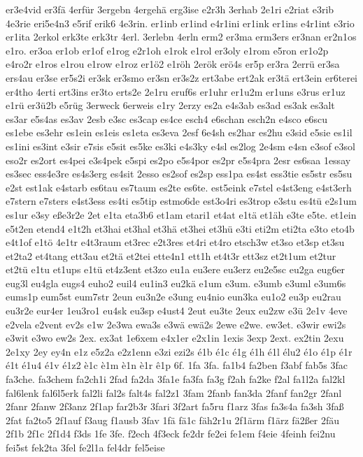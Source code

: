 {er3e4vid
er3fä
4erfür
3ergebn
4ergehä
erg3ise
e2r3h
3erhab
2e1ri
e2riat
e3rib
4e3rie
eri5e4n3
e5rif
erik6
4e3rin.
er1inb
er1ind
e4r1ini
er1ink
er1ins
e4r1int
e3rio
er1ita
2erkol
erk3te
erk3tr
4erl.
3erlebn
4erln
erm2
er3ma
erm3ers
er3nan
er2n1os
e1ro.
er3oa
er1ob
er1of
e1rog
e2r1oh
e1rok
e1rol
er3oly
e1rom
e5ron
er1o2p
e4ro2r
e1ros
e1rou
e1row
e1roz
er1ö2
e1röh
2erök
erö4s
er5p
er3ra
2errü
er3sa
ers4au
er3se
er5s2i
er3sk
er3smo
er3sn
er3s2z
ert3abe
ert2ak
er3tä
ert3ein
er6terei
er4tho
4erti
ert3ins
er3to
erts2e
2e1ru
eruf6s
er1uhr
er1u2m
er1uns
e3rus
er1uz
e1rü
er3ü2b
e5rüg
3erweck
6erweis
e1ry
2erzy
es2a
e4s3ab
es3ad
es3ak
es3alt
es3ar
e5s4as
es3av
2esb
e3sc
es3cap
es4ce
esch4
e6schan
esch2n
e4sco
e6scu
es1ebe
es3ehr
es1ein
es1eis
es1eta
es3eva
2esf
6e4sh
es2har
es2hu
e3sid
e5sie
es1il
es1ini
es3int
e3sir
e7sis
e5sit
es5ke
es3ki
e4s3ky
e4sl
es2log
2e4sm
e4sn
e3sof
e3sol
eso2r
es2ort
es4pei
e3s4pek
e5spi
es2po
e5s4por
es2pr
e5s4pra
2esr
es6saa
1essay
es3sec
ess4e3re
es4s3erg
es4sit
2esso
es2sof
es2sp
ess1pa
es4st
ess3tie
es5str
es5su
e2st
est1ak
e4starb
es6tau
es7taum
es2te
es6te.
est5eink
e7stel
e4st3eng
e4st3erh
e7stern
e7sters
e4st3ess
es4ti
es5tip
estmo6de
est3o4ri
es3trop
e3stu
es4tü
e2s1um
es1ur
e3sy
eße3r2e
2et
e1ta
eta3b6
et1am
etari1
et4at
e1tä
et1äh
e3te
e5te.
et1ein
e5t2en
etend4
e1t2h
et3hai
et3hal
et3hä
et3hei
et3hü
e3ti
eti2m
eti2ta
e3to
eto4b
e4t1of
e1tö
4e1tr
e4t3raum
et3rec
e2t3res
et4ri
et4ro
etsch3w
et3so
et3sp
et3su
et2ta2
et4tang
ett3au
et2tä
et2tei
ette4n1
ett1h
et4t3r
ett3sz
et2t1um
et2tur
et2tü
e1tu
et1ups
e1tü
et4z3ent
et3zo
eu1a
eu3ere
eu3erz
eu2e5sc
eu2ga
eug6er
eug3l
eu4gla
eugs4
euho2
euil4
eu1in3
eu2kä
e1um
e3um.
e3umb
e3uml
e3um6s
eums1p
eum5st
eum7str
2eun
eu3n2e
e3ung
eu4nio
eun3ka
eu1o2
eu3p
eu2rau
eu3r2e
eur4er
1eu3ro1
eu4sk
eu3sp
e4ust4
2eut
eu3te
2eux
eu2zw
e3ü
2e1v
4eve
e2vela
e2vent
ev2s
e1w
2e3wa
ewa3s
e3wä
ewä2s
2ewe
e2we.
ew3et.
e3wir
ewi2s
e3wit
e3wo
ew2s
2ex.
ex3at
1e6xem
e4x1er
e2x1in
1exis
3exp
2ext.
ex2tin
2exu
2e1xy
2ey
ey4n
e1z
e5z2a
e2z1enn
e3zi
ezi2s
é1b
é1c
é1g
é1h
é1l
élu2
é1o
é1p
é1r
é1t
é1u4
é1v
é1z2
è1c
è1m
è1n
è1r
ê1p
6f.
1fa
3fa.
fa1b4
fa2ben
f3abf
fab5s
3fac
fa3che.
fa3chem
fa2ch1i
2fad
fa2da
3fa1e
fa3fa
fa3g
f2ah
fa2ke
f2al
fa1l2a
fal2kl
fal6lenk
fal6l5erk
fal2li
fal2s
falt4s
fal2z1
3fam
2fanb
fan3da
2fanf
fan2gr
2fanl
2fanr
2fanw
2f3anz
2f1ap
far2b3r
3fari
3f2art
fa5ru
f1arz
3fas
fa3s4a
fa3sh
3faß
2fat
fa2to5
2f1auf
f3aug
f1ausb
3fav
1fä
fä1c
fäh2r1u
2f1ärm
f1ärz
fä2ßer
2fäu
2f1b
2f1c
2f1d4
f3ds
1fe
3fe.
f2ech
4f3eck
fe2dr
fe2ei
fe1em
f4eie
4feinh
fei2nu
fei5st
fek2ta
3fel
fe2l1a
fel4dr
fel5eise
}
